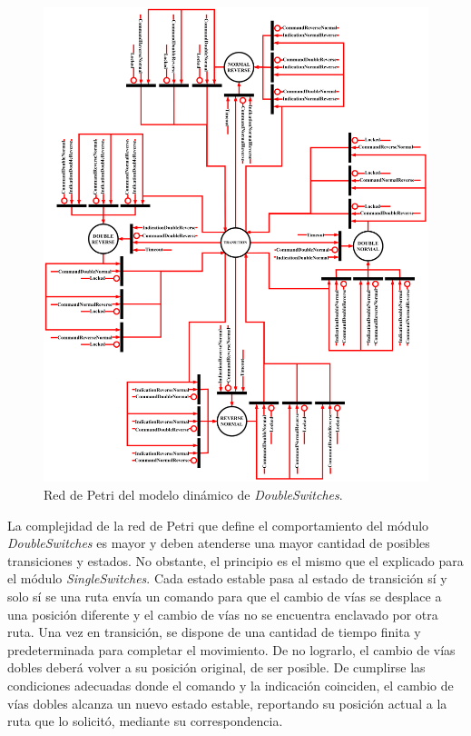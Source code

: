 	\begin{figure}[H]
		\centering
		\includegraphics[width=1\textwidth]{Figuras/DSW_petri}
		\centering\caption{Red de Petri del modelo dinámico de \textit{DoubleSwitches}.}
		\label{fig:DSW_Petri}
	\end{figure}
	
	La complejidad de la red de Petri que define el comportamiento del módulo \textit{DoubleSwitches} es mayor y deben atenderse una mayor cantidad de posibles transiciones y estados. No obstante, el principio es el mismo que el explicado para el módulo \textit{SingleSwitches}. Cada estado estable pasa al estado de transición sí y solo sí se una ruta envía un comando para que el cambio de vías se desplace a una posición diferente y el cambio de vías no se encuentra enclavado por otra ruta. Una vez en transición, se dispone de una cantidad de tiempo finita y predeterminada para completar el movimiento. De no lograrlo, el cambio de vías dobles deberá volver a su posición original, de ser posible. De cumplirse las condiciones adecuadas donde el comando y la indicación coinciden, el cambio de vías dobles alcanza un nuevo estado estable, reportando su posición actual a la ruta que lo solicitó, mediante su correspondencia.
